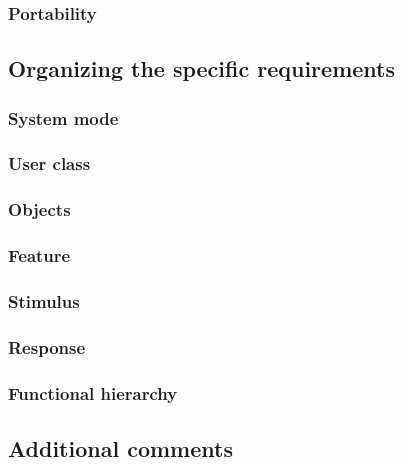 \subsubsection{Portability}

\subsection{Organizing the specific requirements}

\subsubsection{System mode}

\subsubsection{User class}

\subsubsection{Objects}

\subsubsection{Feature}

\subsubsection{Stimulus}

\subsubsection{Response}

\subsubsection{Functional hierarchy}

\subsection{Additional comments}
